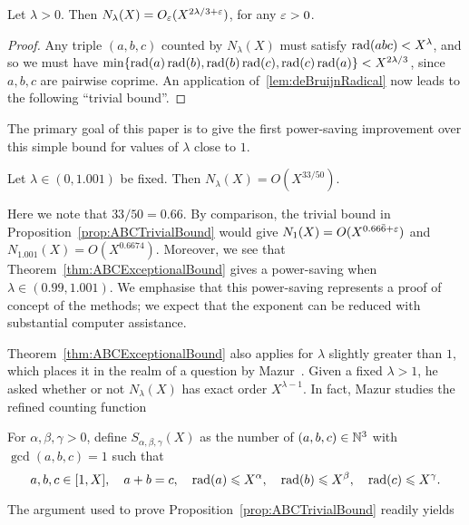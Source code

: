 \begin{proposition}\label{prop:ABCTrivialBound}
  Let $\lambda>0$. Then
  $N_\lambda(X)=O_\varepsilon( X^{2\lambda/3+\varepsilon})$,
  for any $\varepsilon>0$.
  \end{proposition}
\begin{proof}
  Any triple $(a,b,c)$ counted by
  $N_\lambda(X)$ must satisfy $\operatorname{rad}(abc)< X^{\lambda}$, and so
  we must have
  $\min\{\operatorname{rad}(a)\operatorname{rad}(b),\operatorname{rad}(b)\operatorname{rad}(c),\operatorname{rad}(c)\operatorname{rad}(a)\}< X^{2\lambda/3}$, since $a,b,c$ are pairwise coprime.
  An application of~\ref{lem:deBruijnRadical} now leads to the following ``trivial bound''.
\end{proof}

The primary goal of this paper is to give the first power-saving improvement over this simple bound for values of $\lambda$ close to $1$.


\begin{theorem}\label{thm:ABCExceptionalBound}
Let $\lambda\in (0, 1.001)$ be fixed. Then
$N_\lambda(X)=O( X^{33/50})$.
\end{theorem}

Here we note that $33/50=0.66$. By comparison, the trivial bound in Proposition~\ref{prop:ABCTrivialBound} would give $N_1(X)=O(X^{0.66\bar{6}+\varepsilon})$ and $N_{1.001}(X)=O(X^{0.6674})$.
Moreover, we see that Theorem~\ref{thm:ABCExceptionalBound} gives a power-saving when $\lambda\in (0.99,1.001)$. We emphasise that this power-saving represents a proof of concept of the methods; we expect that the exponent can be reduced with substantial computer assistance.


 Theorem~\ref{thm:ABCExceptionalBound} also applies for $\lambda$ slightly greater than $1$,
 which places it in the realm of a question by Mazur~\cite{mazur}.
Given a fixed $\lambda>1$, he asked whether or not
$ N_\lambda(X)$ has exact order
 $ X^{\lambda-1}$.
 In fact, Mazur studies
 the refined counting function

\begin{definition}\label{def:Sabc}
For $\alpha,\beta,\gamma>0$, define $S_{\alpha,\beta,\gamma}(X)$
as the number of
 $(a,b,c)\in \mathbb{N}^3$
with $\gcd(a,b,c)=1$ such that
 \[
 a,b,c\in [1,X], \quad a+b=c, \quad \operatorname{rad}(a)\leqslant X^\alpha, \quad
 \operatorname{rad}(b)\leqslant X^\beta, \quad
 \operatorname{rad}(c)\leqslant X^\gamma.
 \]
\end{definition}

The argument used to prove Proposition~\ref{prop:ABCTrivialBound} readily yields

